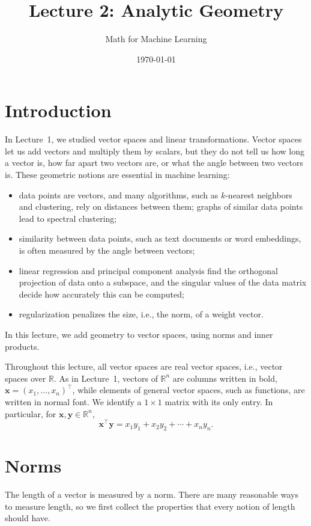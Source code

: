 \documentclass[11pt]{article}
\title{Lecture 2: Analytic Geometry}
\author{Math for Machine Learning}
\date{\today}
\theoremstyle{definition}
\theoremstyle{plain}
\theoremstyle{remark}
\begin{document}
\maketitle
\tableofcontents

\section*{Introduction}

In Lecture~1, we studied vector spaces and linear transformations. Vector spaces let us add vectors and multiply them by scalars, but they do not tell us how long a vector is, how far apart two vectors are, or what the angle between two vectors is. These geometric notions are essential in machine learning:
\begin{itemize}
    \item data points are vectors, and many algorithms, such as $k$-nearest neighbors and clustering, rely on distances between them; graphs of similar data points lead to spectral clustering;
    \item similarity between data points, such as text documents or word embeddings, is often measured by the angle between vectors;
    \item linear regression and principal component analysis find the orthogonal projection of data onto a subspace, and the singular values of the data matrix decide how accurately this can be computed;
    \item regularization penalizes the size, i.e., the norm, of a weight vector.
\end{itemize}
In this lecture, we add geometry to vector spaces, using norms and inner products.

Throughout this lecture, all vector spaces are real vector spaces, i.e., vector spaces over $\mathbb{R}$. As in Lecture~1, vectors of $\mathbb{R}^n$ are columns written in bold, $\mathbf{x} = (x_1, \ldots, x_n)^\top$, while elements of general vector spaces, such as functions, are written in normal font. We identify a $1 \times 1$ matrix with its only entry. In particular, for $\mathbf{x}, \mathbf{y} \in \mathbb{R}^n$,
\[\mathbf{x}^\top \mathbf{y} = x_1 y_1 + x_2 y_2 + \cdots + x_n y_n.\]

\section{Norms}

The length of a vector is measured by a norm. There are many reasonable ways to measure length, so we first collect the properties that every notion of length should have.
\end{document}
